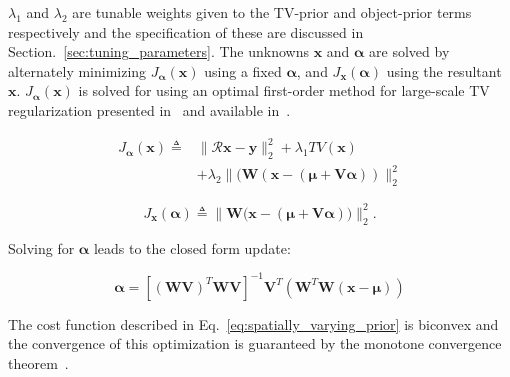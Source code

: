 \documentclass[journal]{IEEEtran}
\def\x{{\mathbf x}}
\begin{document}
$\lambda_1$ and $\lambda_2$ are tunable weights given to the TV-prior
and object-prior terms respectively and the specification of these are
discussed in Section.~\ref{sec:tuning_parameters}. The unknowns
$\boldsymbol{x}$ and $\boldsymbol{\alpha}$ are solved by alternately
minimizing $J_{\boldsymbol{\alpha}}(\boldsymbol{x})$ using a fixed
$\boldsymbol{\alpha}$, and $J_{\boldsymbol{x}}(\boldsymbol{\alpha})$
using the resultant $\boldsymbol{x}$.
$J_{\boldsymbol{\alpha}}(\boldsymbol{x})$ is solved for using an
optimal first-order method for large-scale TV regularization presented
in~\cite{TVReg} and available in~\cite{TVReg-lib}.

\begin{equation}
  \begin{split}
    J_{\boldsymbol{\alpha}}(\boldsymbol{\x}) \triangleq &\lVert\boldsymbol{\mathcal{R} x- y}\rVert_2^2  + \lambda_1TV(\boldsymbol{x}) \\
    &+\lambda_2\lVert(\boldsymbol{W}(\boldsymbol{x} - (\boldsymbol{\mu + V\alpha}))\rVert_2^2
  \end{split}
    \label{eq:compute_x}
  \end{equation}
  
\begin{equation}
  J_{\boldsymbol{x}}(\boldsymbol{\alpha}) \triangleq \lVert{\boldsymbol{W}(\boldsymbol{x}} - (\boldsymbol{\mu + V\alpha}))\rVert_2^2.
\end{equation}

Solving for $\boldsymbol{\alpha}$ leads to the closed form update:

\begin{equation}
  \boldsymbol{\alpha} = [(\boldsymbol{WV})^T\boldsymbol{WV}]^{-1}\boldsymbol{V}^T(\boldsymbol{W}^T\boldsymbol{W}(\boldsymbol{x} - \boldsymbol{\mu}))
  \label{eq:compute_alpha}
\end{equation}

The cost function described in Eq.~\ref{eq:spatially_varying_prior} is biconvex and the convergence of this optimization is guaranteed by the monotone convergence theorem~\cite{monotone}.
\end{document}
